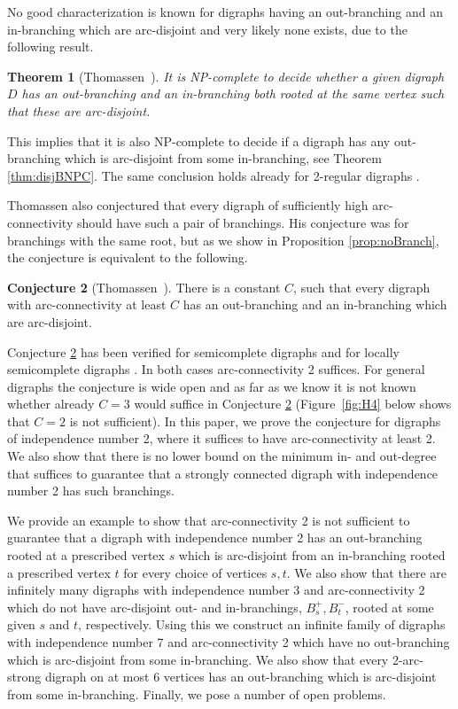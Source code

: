 \documentclass{article}
\newtheorem{theorem}{Theorem}
\theoremstyle{definition}
\newtheorem{conjecture}[theorem]{Conjecture}
\newcommand{\AY}[1]{{#1}}
\newcommand{\jbj}[1]{{#1}}
\newcommand{\2}{\vspace{0.2cm}}
\begin{document}
No good characterization is known for digraphs having an out-branching
and an in-branching which are arc-disjoint and very likely none
exists, due to the following result.


\begin{theorem}[Thomassen~\cite{bangJCT51}]
  \label{thm:CTNPC}
It is NP-complete to decide whether a given digraph $D$ has an
out-branching and an in-branching both rooted at the same vertex such
that these are arc-disjoint.
\end{theorem}

This implies that it is also NP-complete to decide if a digraph has
any out-branching which is arc-disjoint from some in-branching, see
Theorem \ref{thm:disjBNPC}.  The same conclusion holds already for
2-regular digraphs \cite{bangDAM161a}.

Thomassen also conjectured that every digraph of sufficiently high
arc-connectivity should have such a pair of branchings. His conjecture
was for branchings with the same root, but as we show in Proposition
\ref{prop:noBranch}, the conjecture is equivalent to the following.

\begin{conjecture}[Thomassen~\cite{thomassen1989}]
  \label{conj:CTbranch}
There is a constant $C$, \AY{such that} every digraph with arc-connectivity at least $C$ has an
out-branching and an in-branching which are arc-disjoint.
\end{conjecture}

Conjecture \ref{conj:CTbranch} has been verified for semicomplete
digraphs \cite{bangJCT51} and for locally semicomplete digraphs
\cite{bangJCT102}. In both cases arc-connectivity 2 suffices. For
general digraphs the conjecture is wide open and as far as we know it
is not known whether already $C=3$ would suffice
in Conjecture \ref{conj:CTbranch} \AY{(Figure~\ref{fig:H4} below shows that $C=2$ is not sufficient)}. In this paper, we prove the
conjecture for digraphs of independence number 2, where it suffices to
have arc-connectivity at least 2. We also show that there is no lower
bound on the minimum in- and out-degree that suffices to guarantee
that a strongly connected digraph with independence number 2 has such branchings.

We provide an example to show that arc-connectivity 2 is not
sufficient to guarantee that a digraph with independence number 2 has
an out-branching rooted at a prescribed vertex $s$ which is
arc-disjoint from an in-branching rooted a prescribed vertex $t$ for
every choice of vertices $s,t$. We also show that there are infinitely
many digraphs with independence number 3 and arc-connectivity 2 which
do not have arc-disjoint \AY{out- and in-branchings, $B_s^+,B_t^-$, rooted at some given
$s$ and $t$, respectively}. Using this we construct an infinite family of digraphs
with independence number 7 and arc-connectivity 2 which have no
out-branching which is arc-disjoint from some in-branching. \jbj{We also show that every 2-arc-strong digraph on at most 6 vertices has an out-branching which is arc-disjoint from some in-branching. Finally, we pose a number of open problems. }
\end{document}
